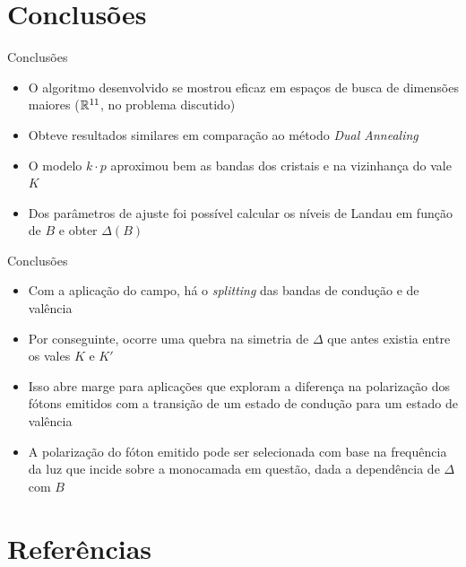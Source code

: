 \section{Conclusões}

\begin{frame}{Conclusões}
  \begin{itemize}
    \item O algoritmo desenvolvido se mostrou eficaz em espaços de busca de
          dimensões maiores ($\mathbb{R}^{11}$, no problema discutido)
    \item Obteve resultados similares em comparação ao método \textit{Dual Annealing}
    \item O modelo $k \cdot p$ aproximou bem as bandas dos cristais  e
           na vizinhança do vale $K$
    \item Dos parâmetros de ajuste foi possível calcular os níveis de Landau em
          função de $B$ e obter $\Delta (B)$
  \end{itemize}
\end{frame}

\begin{frame}{Conclusões}
  \begin{itemize}
    \item Com a aplicação do campo, há o \textit{splitting} das bandas de
          condução e de valência
    \item Por conseguinte, ocorre uma quebra na simetria de $\Delta$ que antes
          existia entre os vales $K$ e $K'$
    \item Isso abre marge para aplicações que exploram a diferença na
          polarização dos fótons emitidos com a transição de um
          estado de condução para um estado de valência
    \item A polarização do fóton emitido pode ser selecionada com base na
          frequência da luz que incide sobre a monocamada em questão, dada a
          dependência de $\Delta$ com $B$
  \end{itemize}
\end{frame}

\section{Referências}

\nocite{dias2016article}
\nocite{dias2016tmdc}
\nocite{kolobov2016tmdc}


